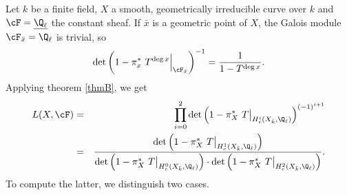 Let $k$ be a finite field, $X$ a smooth, geometrically irreducible curve over $k$ and $\cF = \underline{\Q_\ell}$ the constant sheaf. If $\bar x$ is a geometric point of $X$, the Galois module $\cF_{\bar x} = \Q_\ell$ is trivial, so  
$$
\det\left(1-\pi_x^*\ T^{\deg x}\Big|_{\cF_{\bar x}}\right)^{-1} = \frac{1}{1-T^{\deg x}}.
$$
Applying theorem \ref{thmB}, we get
\begin{eqnarray*}
L(X, \cF) & = & \prod_{i=0}^2 \det\left(1-\pi_X^*\ T\big|_{H_c^i(X_{\bar k}, \Q_\ell)}\right)^{(-1)^{i+1}} \\
& = & 
\frac{\det\left(1-\pi_X^*\ T\big|_{H_c^1(X_{\bar k}, \Q_\ell)}\right)}{\det\left(1-\pi_X^*\ T\big|_{H_c^0(X_{\bar k}, \Q_\ell)}\right)\cdot\det\left(1-\pi_X^*\ T\big|_{H_c^2(X_{\bar k}, \Q_\ell)}\right)}.
\end{eqnarray*}
To compute the latter, we distinguish two cases.
